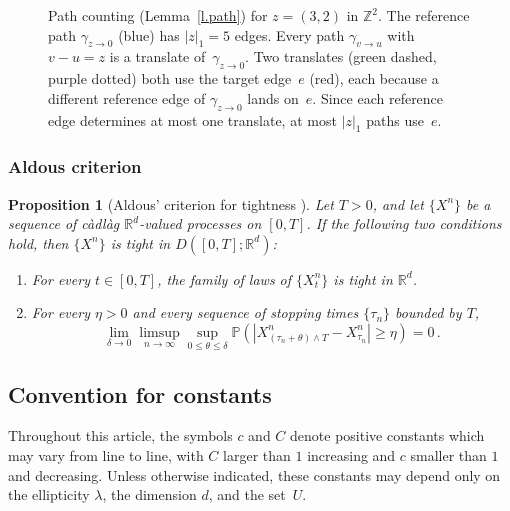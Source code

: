 \documentclass[11pt]{amsart}
\theoremstyle{plain}
\newtheorem{proposition}[theorem]{Proposition}
\theoremstyle{definition}
\theoremstyle{remark}
\newcommand{\Rd}{\mathbb{R}^d}
\newcommand{\Z}{\mathbb{Z}}
\renewcommand{\P}{\mathbb{P}}
\begin{document}
\begin{figure}[ht]
		\caption{Path counting (Lemma~\ref{l.path}) for $z = (3,2)$ in $\Z^2$.
			The reference path $\gamma_{z \to 0}$ (blue) has $|z|_1 = 5$ edges.
			Every path $\gamma_{v \to u}$ with $v - u = z$ is a translate of~$\gamma_{z \to 0}$.
			Two translates (green dashed, purple dotted) both use the target edge~$e$ (red), each because a different reference edge of $\gamma_{z \to 0}$ lands on~$e$.
			Since each reference edge determines at most one translate, at most $|z|_1$ paths use~$e$.}
		\label{fig:pathcount}
	\end{figure}
	
	
	\subsubsection{Aldous criterion} \label{sec:aldouscriterion}
	
	\begin{proposition}[Aldous' criterion for tightness {\cite[Theorem~16.10]{Billingsley1999}}]
		Let $T > 0$, and let $\{X^n\}$ be a sequence of c\`adl\`ag $\Rd$-valued processes on $[0,T]$.
		If the following two conditions hold, then $\{X^n\}$ is tight in $D([0,T]; \Rd)$:
		\begin{enumerate}
			\item For every $t \in [0,T]$, the family of laws of $\{X^n_t\}$ is tight in $\Rd$.
			\item For every $\eta > 0$ and every sequence of stopping times $\{\tau_n\}$ bounded by $T$,
			\[
			\lim_{\delta \to 0} \limsup_{n \to \infty} \sup_{0 \le \theta \le \delta} \P\left( |X^n_{(\tau_n + \theta) \wedge T} - X^n_{\tau_n}| \ge \eta \right) = 0\,.
			\]
		\end{enumerate}
	\end{proposition}
	
	\subsection{Convention for constants} Throughout this article, the symbols $c$ and $C$ denote positive constants which may vary from line to line, with $C$ larger than $1$ increasing and $c$ smaller than $1$ and decreasing. Unless otherwise indicated, these constants may depend only on the ellipticity $\lambda$, the dimension $d$, and the set~$U$.
	
\end{document}
